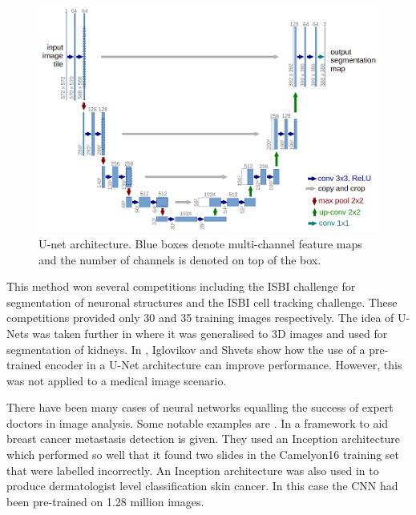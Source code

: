 \begin{figure}[hbtp!]
    \centering
    \includegraphics[width=\textwidth]{./img/u-net-architecture.png}
    \caption{U-net architecture. Blue boxes denote multi-channel feature maps and the number of channels is denoted on top of the box. \cite{Ronneberger_Fischer_Brox_2015}}
    \label{fig:unet}
\end{figure}

This method won several competitions including the ISBI challenge for segmentation of neuronal structures and the ISBI cell tracking challenge.
These competitions provided only 30 and 35 training images respectively.
The idea of U-Nets was taken further in \cite{Cicek_Abdulkadir_Lienkamp_Brox_Ronneberger_2016} where it was generalised to 3D images and used for segmentation of kidneys.
In \cite{Iglovikov_Shvets_2018}, Iglovikov and Shvets show how the use of a pre-trained encoder in a U-Net architecture can improve performance.
However, this was not applied to a medical image scenario.

There have been many cases of neural networks equalling the success of expert doctors in image analysis.
Some notable examples are \cite{Liu_Gadepalli_Norouzi_Dahl_Kohlberger_Boyko_Venugopalan_Timofeev_Nelson_Corrado_et_al_2017, Esteva_Kuprel_Novoa_Ko_Swetter_Blau_Thrun_2017}.
In \cite{Liu_Gadepalli_Norouzi_Dahl_Kohlberger_Boyko_Venugopalan_Timofeev_Nelson_Corrado_et_al_2017} a framework to aid breast cancer metastasis detection is given.
They used an Inception architecture \cite{Russakovsky_Deng_Su_Krause_Satheesh_Ma_Huang_Karpathy_Khosla_Bernstein_et_al_2015} which performed so well that it found two slides in the Camelyon16 \cite{Camelyon16} training set that were labelled incorrectly.
An Inception architecture was also used in  \cite{Esteva_Kuprel_Novoa_Ko_Swetter_Blau_Thrun_2017} to produce dermatologist level classification skin cancer.
In this case the CNN had been pre-trained on 1.28 million images.



